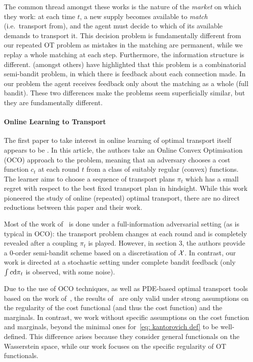         The common thread amongst these works is the nature of the \emph{market} on which they work: at each time $t$, a new supply becomes available to \emph{match} (i.e.\ transport from), and the agent must decide to which of its available demands to transport it. This decision problem is fundamentally different from our repeated OT problem as mistakes in the matching are permanent, while we replay a whole matching at each step.
        Furthermore, the information structure is different. \cite{jagadeesan_learning_2021,sentenac_pure_2021,sentenac_learning_2023} (amongst others) have highlighted that this problem is a combinatorial semi-bandit problem, in which there is feedback about each connection made. In our problem the agent receives feedback only about the matching as a whole (full bandit). These two differences make the problems seem superficially similar, but they are fundamentally different.
                          
        \paragraph{Online Learning to Transport}
        The first paper to take interest in online learning of optimal transport itself appears to be \citep{guo_online_2022-1}. In this article, the authors take an Online Convex Optimisation (OCO) approach to the problem, meaning that an adversary chooses a cost function $c_t$ at each round $t$ from a class of suitably regular (convex) functions. The learner aims to choose a sequence of transport plans $\pi_t$ which has a small regret with respect to the best fixed transport plan in hindsight. While this work pioneered the study of online (repeated) optimal transport, there are no direct reductions between this paper and their work.

        Most of the work of~\cite{guo_online_2022-1} is done under a full-information adversarial setting (as is typical in OCO): the transport problem changes at each round and is completely revealed after a coupling $\pi_t$ is played. However, in section 3, the authors provide a $0$-order semi-bandit scheme based on a discretisation of $\mathcal{X}$. In contrast, our work is directed at a stochastic setting under complete bandit feedback (only $\int c\mathrm{d} \pi_t$ is observed, with some noise).
        
        Due to the use of OCO techniques, as well as PDE-based optimal transport tools based on the work of~\cite{brenier_least_1989}, the results of~\cite{guo_online_2022-1} are only valid under strong assumptions on the regularity of the cost functional (and thus the cost function) and the marginals. In contrast, we work without specific assumptions on the cost function and marginals, beyond the minimal ones for~\eqref{eq: kantorovich def} to be well-defined. This difference arises because they consider general functionals on the Wasserstein space, while our work focuses on the specific regularity of OT functionals.

